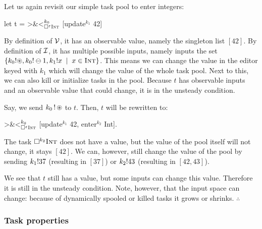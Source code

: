 \begin{example}
  \label{exm:integer-task-pool}
  Let us again revisit our simple task pool to enter integers:
  \begin{TASK}
    let t = >&<$_{\square^\varepsilon {\text{\normalfont\sffamily\scshape Int}}}^{k_0}$ [update$^{k_1}$ 42]
  \end{TASK}

  By definition of $\mathcal{V}$, it has an observable value, namely the singleton list $[42]$.
  By definition of $\mathcal{I}$, it has multiple possible inputs,
  namely inputs the set $\{k_0!\circledast, k_0!\ominus1, k_1! x \;\mid\; x\in{\text{\normalfont\sffamily\scshape Int}}\}$.
  This means we can change the value in the editor keyed with $k_1$
  which will change the value of the whole task pool.
  Next to this, we can also kill or initialize tasks in the pool.
  Because $t$ has observable inputs and an observable value that could change,
  it is in the unsteady condition.

  Say, we send $k_0\,!\,\circledast$ to $t$.
  Then, $t$ will be rewritten to:
  \begin{TASK}
    >&<$_{\square^\varepsilon {\text{\normalfont\sffamily\scshape Int}}}^{k_0}$ [update$^{k_1}$ 42, enter$^{k_2}$ Int].
  \end{TASK}
  The task $\square^{k_2}{\text{\normalfont\sffamily\scshape Int}}$ does not have a value,
  but the value of the pool itself will not change,
  it stays $[42]$.
  We can, however, still change the value of the pool by sending
  $k_1!37$ (resulting in $[37]$) or $k_2!43$ (resulting in $[42,43]$).

  We see that $t$ still has a value,
  but some inputs can change this value.
  Therefore it is still in the unsteady condition.
  Note, however, that the input space can change:
  because of dynamically spooled or killed tasks it grows or shrinks.
\hfill$\therefore$\end{example}


\subsubsection{Task properties}
\label{sub:task-properties}


